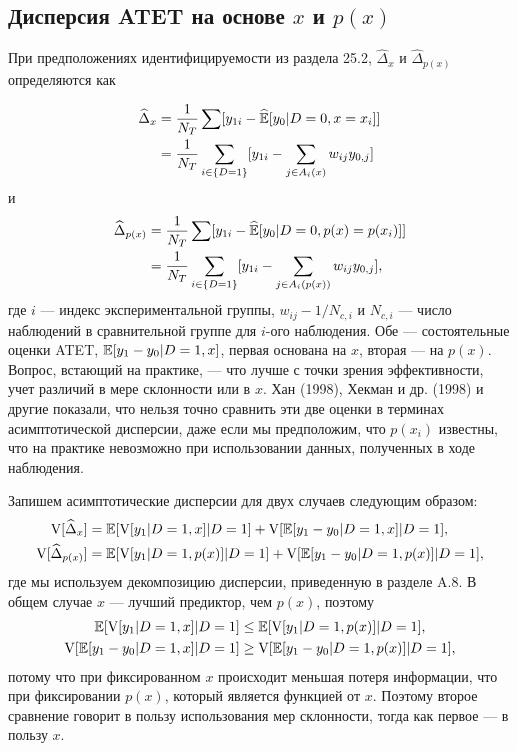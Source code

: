 \subsection{Дисперсия ATET на основе $x$ и $p(x)$}

При предположениях идентифицируемости из раздела 25.2, $\widehat \Delta_x$ и $\widehat \Delta_{p(x)}$ определяются как 

\begin{align}
\widehat \Delta_x & =\frac1{N_T} \sum [y_{1i} - \widehat {\mathbb{E}} [y_0 | D = 0, x = x_i]] \nonumber \\
& = \frac1{N_T} \sum_{i \in \{ D = 1 \}} [y_{1i} - \sum_{j \in A_i(x)} w_{ij} y_{0,j}]  \nonumber 
\end{align}
и 
\begin{align}
\widehat \Delta_{p(x)} & =\frac1{N_T} \sum [y_{1i} - \widehat {\mathbb{E}} [y_0 | D = 0, p(x) = p(x_i)]] \nonumber \\
& = \frac1{N_T} \sum_{i \in \{ D = 1 \}} [y_{1i} - \sum_{j \in A_i(p(x))} w_{ij} y_{0,j}],  \nonumber 
\end{align}
где $i$ --- индекс экспериментальной группы, $w_{ij} - 1/N_{c,i}$ и $N_{c,i}$ --- число наблюдений в сравнительной группе для $i$-ого наблюдения. Обе --- состоятельные оценки ATET, $\mathbb{E} [y_1 - y_0 | D = 1 , x]$, первая основана на $x$, вторая --- на $p(x)$. Вопрос, встающий на практике, --- что лучше с точки зрения эффективности, учет различий в мере склонности или в $x$. Хан (1998), Хекман и др. (1998) и другие показали, что нельзя точно сравнить эти две оценки в терминах асимптотической дисперсии, даже если мы предположим, что $p(x_i)$ известны, что на практике невозможно при использовании данных, полученных в ходе наблюдения. 

Запишем асимптотические дисперсии для двух случаев следующим образом:
\begin{align}
\mathrm{V}[\widehat \Delta_x] & = \mathbb{E} [\mathrm{V}[y_1 | D = 1, x] | D = 1] + \mathrm{V} [\mathbb{E}[y_1 - y_0 | D = 1, x] | D = 1], \nonumber \\
\mathrm{V}[\widehat \Delta_{p(x)}] & = \mathbb{E} [\mathrm{V}[y_1 | D = 1, p(x)] | D = 1] + \mathrm{V} [\mathbb{E}[y_1 - y_0 | D = 1, p(x)] | D = 1], \nonumber 
\end{align}
где мы используем декомпозицию дисперсии, приведенную в разделе A.8. В общем случае $x$ --- лучший предиктор, чем $p(x)$, поэтому
\begin{align}
\mathbb{E}[\mathrm{V}[y_1 | D = 1, x] | D = 1] & \le \mathbb{E} [\mathrm{V}[y_1 | D = 1, p(x)] | D = 1] , \nonumber \\
\mathrm{V} [\mathbb{E}[y_1 - y_0 | D = 1, x] | D = 1] & \ge  \mathrm{V} [\mathbb{E}[y_1 - y_0 | D = 1, p(x)] | D = 1], \nonumber 
\end{align}
потому что при фиксированном $x$ происходит меньшая потеря информации, что при фиксировании $p(x)$, который является функцией от $x$. Поэтому второе сравнение говорит в пользу использования мер склонности, тогда как первое --- в пользу $x$. 

